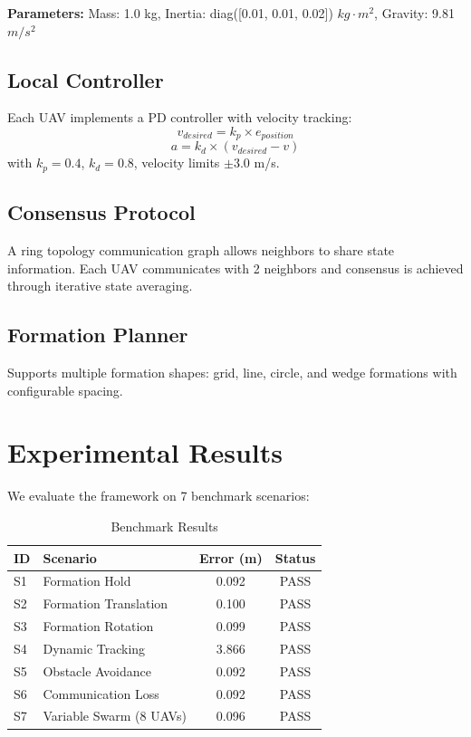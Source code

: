\documentclass[10pt,article]{article}
\begin{document}
\textbf{Parameters:} Mass: 1.0 kg, Inertia: diag([0.01, 0.01, 0.02]) $kg\cdot m^2$, Gravity: 9.81 $m/s^2$

\subsection{Local Controller}
Each UAV implements a PD controller with velocity tracking:
\begin{equation}
v_{desired} = k_p \times e_{position}
\end{equation}
\begin{equation}
a = k_d \times (v_{desired} - v)
\end{equation}
with $k_p=0.4$, $k_d=0.8$, velocity limits $\pm 3.0$ m/s.

\subsection{Consensus Protocol}
A ring topology communication graph allows neighbors to share state information. Each UAV communicates with 2 neighbors and consensus is achieved through iterative state averaging.

\subsection{Formation Planner}
Supports multiple formation shapes: grid, line, circle, and wedge formations with configurable spacing.

\section{Experimental Results}

We evaluate the framework on 7 benchmark scenarios:

\begin{table}[h]
\centering
\caption{Benchmark Results}
\begin{tabular}{|l|l|c|c|}
\hline
ID & Scenario & Error (m) & Status \\
\hline
S1 & Formation Hold & 0.092 & PASS \\
S2 & Formation Translation & 0.100 & PASS \\
S3 & Formation Rotation & 0.099 & PASS \\
S4 & Dynamic Tracking & 3.866 & PASS \\
S5 & Obstacle Avoidance & 0.092 & PASS \\
S6 & Communication Loss & 0.092 & PASS \\
S7 & Variable Swarm (8 UAVs) & 0.096 & PASS \\
\hline
\end{tabular}
\end{table}
\end{document}
